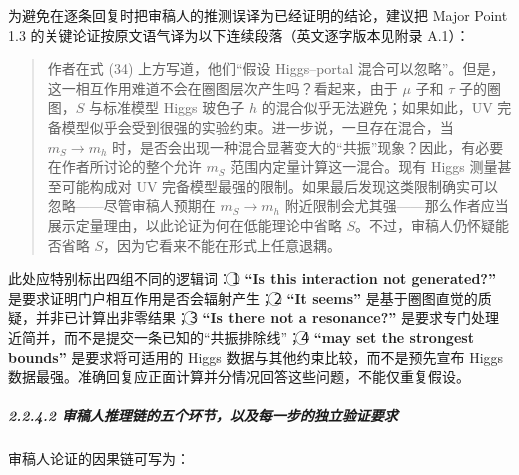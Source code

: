 \documentclass[
  chinese,
  UTF8]{ctexart}
\begin{document}
为避免在逐条回复时把审稿人的推测误译为已经证明的结论，建议把 Major Point
1.3 的关键论证按原文语气译为以下连续段落（英文逐字版本见附录 A.1）：

\begin{quote}
作者在式 (34) 上方写道，他们``假设 Higgs--portal
混合可以忽略''。但是，这一相互作用难道不会在圈图层次产生吗？看起来，由于
\ensuremath{\mu} 子和 \ensuremath{\tau} 子的圈图，\(S\) 与标准模型 Higgs
玻色子 \(h\) 的混合似乎无法避免；如果如此，UV
完备模型似乎会受到很强的实验约束。进一步说，一旦存在混合，当
\(m_S\to m_h\)
时，是否会出现一种混合显著变大的``共振''现象？因此，有必要在作者所讨论的整个允许
\(m_S\) 范围内定量计算这一混合。现有 Higgs 测量甚至可能构成对 UV
完备模型最强的限制。如果最后发现这类限制确实可以忽略------尽管审稿人预期在
\(m_S\to m_h\)
附近限制会尤其强------那么作者应当展示定量理由，以此论证为何在低能理论中省略
\(S\)。不过，审稿人仍怀疑能否省略
\(S\)，因为它看来不能在形式上任意退耦。
\end{quote}

此处应特别标出四组不同的逻辑词：\textcircled{1} \textbf{``Is this
interaction not generated?''}
是要求证明门户相互作用是否会辐射产生；\textcircled{2} \textbf{``It
seems''} 是基于圈图直觉的质疑，并非已计算出非零结果；\textcircled{3}
\textbf{``Is there not a resonance?''}
是要求专门处理近简并，而不是提交一条已知的``共振排除线''；\textcircled{4}
\textbf{``may set the strongest bounds''} 是要求将可适用的 Higgs
数据与其他约束比较，而不是预先宣布 Higgs
数据最强。准确回复应正面计算并分情况回答这些问题，不能仅重复假设。

\subparagraph{2.2.4.2
审稿人推理链的五个环节，以及每一步的独立验证要求}\label{ux5ba1ux7a3fux4ebaux63a8ux7406ux94feux7684ux4e94ux4e2aux73afux8282ux4ee5ux53caux6bcfux4e00ux6b65ux7684ux72ecux7acbux9a8cux8bc1ux8981ux6c42}

审稿人论证的因果链可写为：
\end{document}
